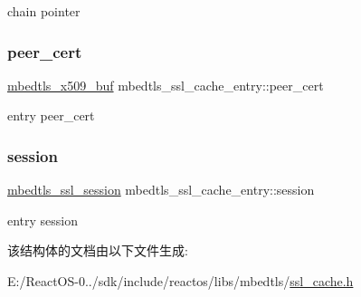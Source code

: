 chain pointer \mbox{\label{structmbedtls__ssl__cache__entry_aaa3550f088fef5e3e2ea793076d77a86}} 
\subsubsection{\texorpdfstring{peer\+\_\+cert}{peer\_cert}}
{\footnotesize\ttfamily \hyperlink{group__x509__module_ga4d02c9e8e4e2934555e0d132cd2976dc}{mbedtls\+\_\+x509\+\_\+buf} mbedtls\+\_\+ssl\+\_\+cache\+\_\+entry\+::peer\+\_\+cert}

entry peer\+\_\+cert \mbox{\label{structmbedtls__ssl__cache__entry_ade27f016c0924422c5ba5e68650744bc}} 
\subsubsection{\texorpdfstring{session}{session}}
{\footnotesize\ttfamily \hyperlink{structmbedtls__ssl__session}{mbedtls\+\_\+ssl\+\_\+session} mbedtls\+\_\+ssl\+\_\+cache\+\_\+entry\+::session}

entry session 

该结构体的文档由以下文件生成\+:\begin{DoxyCompactItemize}
\item 
E\+:/\+React\+O\+S-\/0../sdk/include/reactos/libs/mbedtls/\hyperlink{ssl__cache_8h}{ssl\+\_\+cache.\+h}\end{DoxyCompactItemize}
